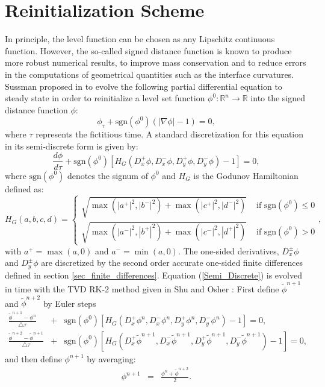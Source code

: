 \documentclass[english]{article}
\begin{document}
\section{Reinitialization Scheme\label{sec_reinitialization}}
In principle, the level function can be chosen as any Lipschitz continuous function. However, the
so-called signed distance function is known to produce more robust numerical results, to improve
mass conservation and to reduce errors in the computations of geometrical quantities such as the
interface curvatures. Sussman \etal proposed in \cite{sussmanfatemi:1998:redistancing} to evolve
the following partial differential equation to steady state in order to reinitialize a level set
function $\phi^0:\mathbb{R}^n\to\mathbb{R}$ into the signed distance function $\phi$:
\begin{equation}
\phi_{\tau} + \mathrm{sgn}(\phi^0)\left( |\nabla\phi|-1 \right)=0,
\label{eq_reinitialization}
\end{equation}
where $\tau$ represents the fictitious time. A standard discretization for
this equation in its semi-discrete form is given by:
\begin{equation}\frac{d\phi}{d\tau} + \mathrm{sgn}(\phi^0)
\left[ H_G\left(D_x^+\phi, D_x^-\phi,
                D_y^+\phi, D_y^-\phi\right)-1\right]=0,\label{Semi_Discrete}\end{equation}
where $\mathrm{sgn}(\phi^0)$ denotes the signum of $\phi^0$ and $H_G$ is the Godunov Hamiltonian
defined as:
\begin{equation*}
H_G(a,b,c,d)=
\begin{cases}
\sqrt{\max(|a^+|^2,|b^-|^2)+\max(|c^+|^2,|d^-|^2)} & \textrm{ if }
\mathrm{sgn}(\phi^0)\le 0 \\
\sqrt{\max(|a^-|^2,|b^+|^2)+\max(|c^-|^2,|d^+|^2)} & \textrm{ if } \mathrm{sgn}(\phi^0)>0
\end{cases},
\end{equation*}
with $a^+=\max(a,0)$ and $a^-=\min(a,0)$. The one-sided derivatives,
$D_x^{\pm}\phi$ and $D_y^{\pm}\phi$ are discretized by the second order
accurate one-sided finite differences defined in section
\ref{sec_finite_differences}. Equation (\ref{Semi_Discrete}) is evolved in
time with the TVD RK-2 method given in Shu and Osher \cite{Shu:1988:ENO}:
First define $\tilde{\phi}^{n+1}$ and $\tilde{\phi}^{n+2}$ by Euler steps
\begin{eqnarray*}
\frac{\tilde{\phi}^{n+1}-\phi^n}{\triangle \tau} &+& \mathrm{sgn}(\phi^0) \left[
H_G\left(D_x^+\phi^n, D_x^-\phi^n,
                D_y^+\phi^n, D_y^-\phi^n\right)-1\right]=0,\\
\frac{\tilde{\phi}^{n+2}-\tilde{\phi}^{n+1}}{\triangle \tau} &+& \mathrm{sgn}(\phi^0) \left[
H_G\left(D_x^+\tilde{\phi}^{n+1}, D_x^-\tilde{\phi}^{n+1},
                D_y^+\tilde{\phi}^{n+1}, D_y^-\tilde{\phi}^{n+1}\right)-1\right]=0,
\end{eqnarray*} and then define $\phi^{n+1}$ by averaging:
\begin{eqnarray*}
\phi^{n+1} &=& \frac{\phi^n + \tilde{\phi}^{n+2}}2.
\end{eqnarray*}
\end{document}
